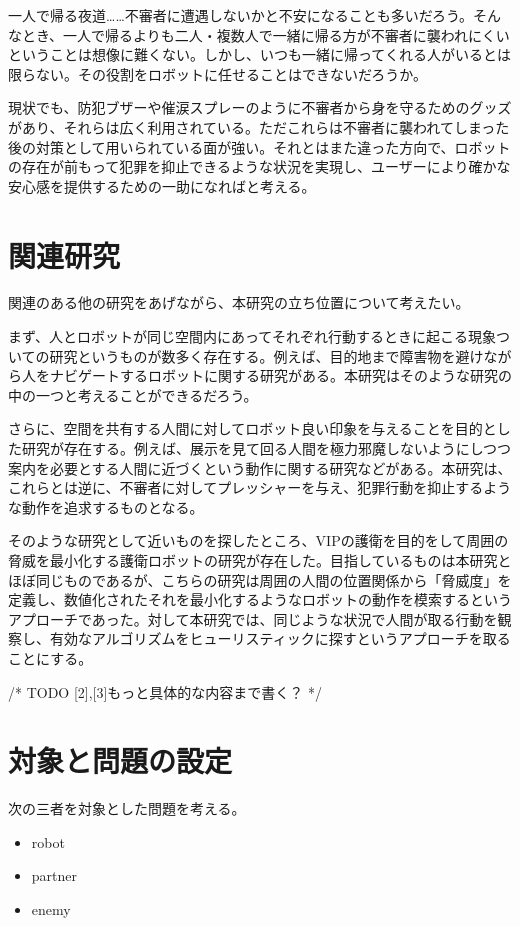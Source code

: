 \documentclass{kuisthesis}
\begin{document}
一人で帰る夜道……不審者に遭遇しないかと不安になることも多いだろう。そんなとき、一人で帰るよりも二人・複数人で一緒に帰る方が不審者に襲われにくいということは想像に難くない。しかし、いつも一緒に帰ってくれる人がいるとは限らない。その役割をロボットに任せることはできないだろうか。

現状でも、防犯ブザーや催涙スプレーのように不審者から身を守るためのグッズがあり、それらは広く利用されている。ただこれらは不審者に襲われてしまった後の対策として用いられている面が強い。それとはまた違った方向で、ロボットの存在が前もって犯罪を抑止できるような状況を実現し、ユーザーにより確かな安心感を提供するための一助になればと考える。

\section{関連研究}
関連のある他の研究をあげながら、本研究の立ち位置について考えたい。

まず、人とロボットが同じ空間内にあってそれぞれ行動するときに起こる現象ついての研究というものが数多く存在する。例えば、目的地まで障害物を避けながら人をナビゲートするロボットに関する研究がある\cite{1}。本研究はそのような研究の中の一つと考えることができるだろう。

さらに、空間を共有する人間に対してロボット良い印象を与えることを目的とした研究が存在する。例えば、展示を見て回る人間を極力邪魔しないようにしつつ案内を必要とする人間に近づくという動作に関する研究\cite{2}などがある。本研究は、これらとは逆に、不審者に対してプレッシャーを与え、犯罪行動を抑止するような動作を追求するものとなる。

そのような研究として近いものを探したところ、VIPの護衛を目的をして周囲の脅威を最小化する護衛ロボットの研究\cite{3}が存在した。目指しているものは本研究とほぼ同じものであるが、こちらの研究\cite{3}は周囲の人間の位置関係から「脅威度」を定義し、数値化されたそれを最小化するようなロボットの動作を模索するというアプローチであった。対して本研究では、同じような状況で人間が取る行動を観察し、有効なアルゴリズムをヒューリスティックに探すというアプローチを取ることにする。

/* TODO [2],[3]もっと具体的な内容まで書く？ */

\section{対象と問題の設定}
次の三者を対象とした問題を考える。

\begin{itemize}
	\item robot
	\item partner
	\item enemy
\end{itemize}
\end{document}
